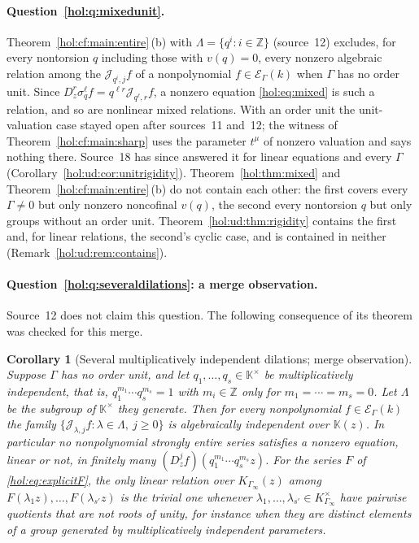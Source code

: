 \documentclass[11pt]{article}
\numberwithin{equation}{section}
\newtheorem{corollary}[theorem]{Corollary}
\theoremstyle{definition}
\theoremstyle{remark}
\newcommand{\Z}{\mathbb Z}
\newcommand{\KK}{\mathbb K}
\newcommand{\EK}{\mathcal E_\Gamma(k)}
\newcommand{\jet}[2]{\mathcal J_{#1,#2}}
\begin{document}
\paragraph{Question~\ref{hol:q:mixedunit}.}
Theorem~\ref{hol:cf:main:entire}\,(b) with $\Lambda=\{q^i:i\in\Z\}$
(source~12) excludes, for every nontorsion $q$ including those with $v(q)=0$,
every nonzero algebraic relation among the $\jet{q^i}jf$ of a nonpolynomial
$f\in\EK$ when $\Gamma$ has no order unit. Since
$D_z^r\sigma_q^\ell f=q^{\ell r}\jet{q^\ell}rf$, a nonzero equation
\eqref{hol:eq:mixed} is such a relation, and so are nonlinear mixed
relations. With an order unit the unit-valuation case stayed open after
sources~11 and~12; the witness of Theorem~\ref{hol:cf:main:sharp} uses the
parameter $t^\mu$ of nonzero valuation and says nothing there. Source~18 has
since answered it for linear equations and every $\Gamma$
(Corollary~\ref{hol:ud:cor:unitrigidity}). Theorem~\ref{hol:thm:mixed} and
Theorem~\ref{hol:cf:main:entire}\,(b) do not contain each other: the first
covers every $\Gamma\ne0$ but only nonzero noncofinal $v(q)$, the second every
nontorsion $q$ but only groups without an order unit. Theorem~\ref{hol:ud:thm:rigidity}
contains the first and, for linear relations, the second's cyclic case, and is
contained in neither (Remark~\ref{hol:ud:rem:contains}).

\paragraph{Question~\ref{hol:q:severaldilations}: a merge observation.}
Source~12 does not claim this question. The following consequence of its
theorem was checked for this merge.

\begin{corollary}[Several multiplicatively independent dilations; merge
observation]\label{hol:cf:cor:several}
Suppose $\Gamma$ has no order unit, and let $q_1,\ldots,q_s\in\KK^\times$ be
multiplicatively independent, that is, $q_1^{m_1}\cdots q_s^{m_s}=1$ with
$m_i\in\Z$ only for $m_1=\cdots=m_s=0$. Let $\Lambda$ be the subgroup of
$\KK^\times$ they generate. Then for every nonpolynomial $f\in\EK$ the family
$\{\jet\lambda jf:\lambda\in\Lambda,\ j\ge0\}$ is algebraically independent
over $\KK(z)$. In particular no nonpolynomial strongly entire series satisfies
a nonzero equation, linear or not, in finitely many
$(D_z^jf)(q_1^{m_1}\cdots q_s^{m_s}z)$. For the series $F$ of
\eqref{hol:eq:explicitF}, the only linear relation over
$K_{\Gamma_\infty}(z)$ among $F(\lambda_1z),\ldots,F(\lambda_{s'}z)$ is the
trivial one whenever $\lambda_1,\ldots,\lambda_{s'}\in K_{\Gamma_\infty}^\times$
have pairwise quotients that are not roots of unity, for instance when they
are distinct elements of a group generated by multiplicatively independent
parameters.
\end{corollary}
\end{document}

